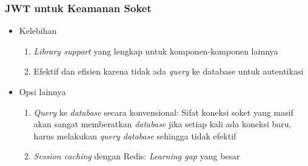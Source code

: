 	\subsubsection{\textsc{JWT} untuk Keamanan Soket}
		\begin{itemize}
			\item Kelebihan
			\begin{enumerate}
				\item \textit{Library support} yang lengkap untuk komponen-komponen lainnya
				\item Efektif dan efisien karena tidak ada \textit{query} ke database untuk autentikasi
			\end{enumerate}
			\item Opsi lainnya
			\begin{enumerate}
				\item \textit{Query} ke \textit{database} secara konvensional:  Sifat koneksi soket yang masif akan sangat memberatkan \textit{database} jika setiap kali ada koneksi baru, harus melakukan \textit{query database} sehingga tidak efektif
				\item \textit{Session caching} dengan Redis:  \textit{Learning gap} yang besar
			\end{enumerate}
		\end{itemize}
		
	
	

	
	
	